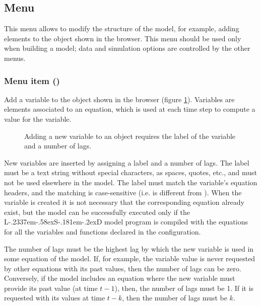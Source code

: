 \documentclass [11pt,a4paper] {book}
\def\LsD{{L\kern-.2337em\lower-.58ex\hbox{S}\kern-.181em\lower-.2ex\hbox{D}}\xspace}
\begin{document}
\subsection{Menu }

This menu allows to modify the structure of the model, for example, adding elements to the object shown in the browser. This menu should be used only when building a model;  data and simulation options are controlled by the other menus.

\subsubsection{Menu item  ()}

Add a variable to the object shown in the browser (figure \ref{fig:new_var}). Variables are elements associated to an equation, which is used at each time step to compute a value for the variable. 

\begin{figure}[ht]
  \centering
  \caption{Adding a new variable to an object requires the label of the variable and a number of lags.}
  \label{fig:new_var}
\end{figure}

New variables are inserted by assigning a label and a number of lags. The label must be a text string without special characters, as spaces, quotes, etc., and must not be used elsewhere in the model. The label must match the variable's equation headers, and the matching is case-sensitive (i.e.  is different from ). When the variable is created it is not necessary that the corresponding equation already exist, but the model can be successfully executed only if the \LsD model program is compiled with the equations for all the variables and functions declared in the configuration.

The number of lags must be the highest lag by which the new variable is used in some equation of the model. If, for example, the variable value is never requested by other equations with its past values, then the number of lags can be zero. Conversely, if the model includes an equation where the new variable must provide its past value (at time $t-1$), then, the number of lags must be 1. If it is requested with its values at time $t-k$, then the number of lags must be $k$.
\end{document}
